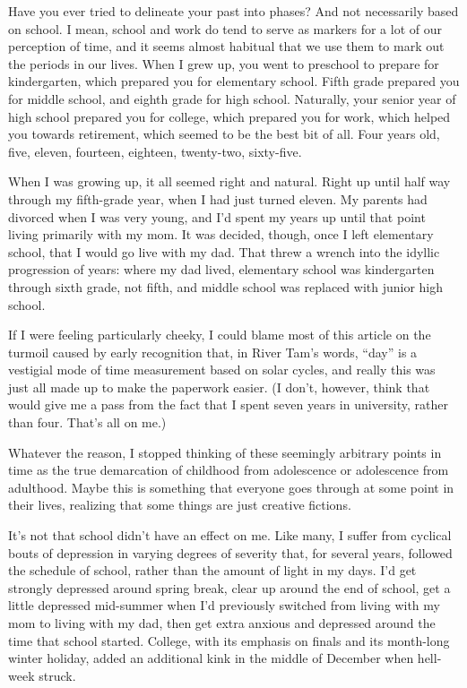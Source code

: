 
Have you ever tried to delineate your past into phases? And not necessarily based on school. I mean, school and work do tend to serve as markers for a lot of our perception of time, and it seems almost habitual that we use them to mark out the periods in our lives. When I grew up, you went to preschool to prepare for kindergarten, which prepared you for elementary school. Fifth grade prepared you for middle school, and eighth grade for high school. Naturally, your senior year of high school prepared you for college, which prepared you for work, which helped you towards retirement, which seemed to be the best bit of all. Four years old, five, eleven, fourteen, eighteen, twenty-two, sixty-five.

When I was growing up, it all seemed right and natural. Right up until half way through my fifth-grade year, when I had just turned eleven. My parents had divorced when I was very young, and I'd spent my years up until that point living primarily with my mom. It was decided, though, once I left elementary school, that I would go live with my dad. That threw a wrench into the idyllic progression of years: where my dad lived, elementary school was kindergarten through sixth grade, not fifth, and middle school was replaced with junior high school.

If I were feeling particularly cheeky, I could blame most of this article on the turmoil caused by early recognition that, in River Tam's words, ``day'' is a vestigial mode of time measurement based on solar cycles, and really this was just all made up to make the paperwork easier. (I don't, however, think that would give me a pass from the fact that I spent seven years in university, rather than four. That's all on me.)

Whatever the reason, I stopped thinking of these seemingly arbitrary points in time as the true demarcation of childhood from adolescence or adolescence from adulthood. Maybe this is something that everyone goes through at some point in their lives, realizing that some things are just creative fictions.

It's not that school didn't have an effect on me. Like many, I suffer from cyclical bouts of depression in varying degrees of severity that, for several years, followed the schedule of school, rather than the amount of light in my days. I'd get strongly depressed around spring break, clear up around the end of school, get a little depressed mid-summer when I'd previously switched from living with my mom to living with my dad, then get extra anxious and depressed around the time that school started. College, with its emphasis on finals and its month-long winter holiday, added an additional kink in the middle of December when hell-week struck.

